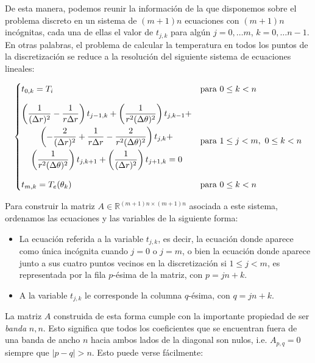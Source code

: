     De esta manera, podemos reunir la información de la que disponemos sobre el problema discreto en un sistema de $(m+1)n$ ecuaciones con $(m+1)n$ incógnitas, cada una de ellas el valor de $t_{j,k}$ para algún $j = 0, \dots m$, $k = 0, \dots n-1$. En otras palabras, el problema de calcular la temperatura en todos los puntos de la discretización se reduce a la resolución del siguiente sistema de ecuaciones lineales:

    \begin{equation} \label{des:eq:sistema}
      \begin{cases}
      \setlength{\jot}{2em}
        t_{0,k} = T_i
          & \text{para } 0 \leq k < n \\[1em]
        \begin{gathered}
          \left( \frac{1}{(\Delta r)^2} - \frac{1}{r \Delta r} \right) t_{j-1,k} +
            \left( \frac{1}{r^2(\Delta \theta)^2} \right) t_{j,k-1} + \\
            \left( - \frac{2}{(\Delta r)^2} + \frac{1}{r \Delta r} - \frac{2}{r^2(\Delta \theta)^2} \right) t_{j,k} + \\
            \left( \frac{1}{r^2(\Delta \theta)^2} \right) t_{j,k+1} +
            \left( \frac{1}{(\Delta r)^2} \right) t_{j+1,k} = 0 \\[1em]
          \end{gathered}
          & \text{para } 1 \leq j < m,\ 0 \leq k < n \\
        t_{m,k} = T_e(\theta_k)
          & \text{para } 0 \leq k < n \\
      \end{cases}
    \end{equation}

    Para construir la matriz $A \in \mathbb{R}^{(m+1)n \times (m+1)n}$ asociada a este sistema, ordenamos las ecuaciones y las variables de la siguiente forma:
    \begin{itemize}
      \item La ecuación referida a la variable $t_{j,k}$, es decir, la ecuación donde aparece como única incógnita cuando $j = 0$ o $j = m$, o bien la ecuación donde aparece junto a sus cuatro puntos vecinos en la discretización si $1 \leq j < m$, es representada por la fila $p$-ésima de la matriz, con $p = jn+k$.
      \item A la variable $t_{j,k}$ le corresponde la columna $q$-ésima, con $q = jn+k$.
    \end{itemize}

    La matriz $A$ construida de esta forma cumple con la importante propiedad de ser \emph{banda} $n, n$. Esto significa que todos los coeficientes que se encuentran fuera de una banda de ancho $n$ hacia ambos lados de la diagonal son nulos, i.e. $A_{p,q} = 0$ siempre que $\vert p - q \vert > n$. Esto puede verse fácilmente:

